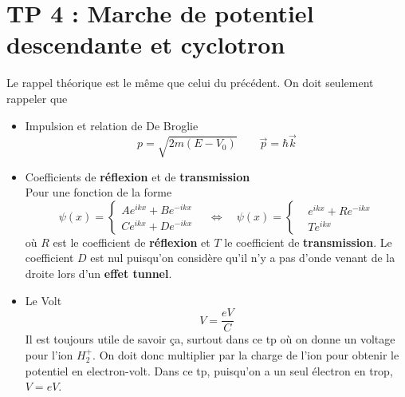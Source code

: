\section*{TP 4 : Marche de potentiel descendante et cyclotron}
Le rappel théorique est le même que celui du précédent. On doit seulement rappeler que 
\begin{itemize}
	\item Impulsion et relation de De Broglie
	      \begin{equation}
	      	p = \sqrt{2m(E-V_0)} \qquad  \vec{p} = \hbar \vec{k}
	      \end{equation}
	      		
	\item Coefficients de \textbf{réflexion} et de \textbf{transmission}\\
	      Pour une fonction de la forme
	      \begin{equation}
	      	\psi(x) = 
	      	\left\{
	      	\begin{aligned}
	      		Ae^{ikx}+Be^{-ikx} \\
	      		Ce^{ikx}+De^{-ikx} 
	      	\end{aligned}			
	      	\right.
	      	\quad			
	      	\Leftrightarrow 
	      	\quad
	      	\psi(x) = 
	      	\left\{
	      	\begin{aligned}
	      		  & e^{ikx}+Re^{-ikx} \\
	      		  & Te^{ikx}          
	      	\end{aligned}			
	      	\right.
	      \end{equation}
	      où $R$ est le coefficient de \textbf{réflexion} et $T$ le coefficient de \textbf{transmission}. Le coefficient $D$ est nul puisqu'on considère qu'il n'y a pas d'onde venant de la droite lors d'un \textbf{effet tunnel}.
	      		
	\item Le Volt 
	      \begin{equation}
	      	V = \frac{eV}{C}
	      \end{equation}
	      Il est toujours utile de savoir ça, surtout dans ce tp où on donne un voltage pour l'ion $H_2^+$. On doit donc multiplier par la charge de l'ion pour obtenir le potentiel en electron-volt. Dans ce tp, puisqu'on a un seul électron en trop, $V = eV$.
\end{itemize}